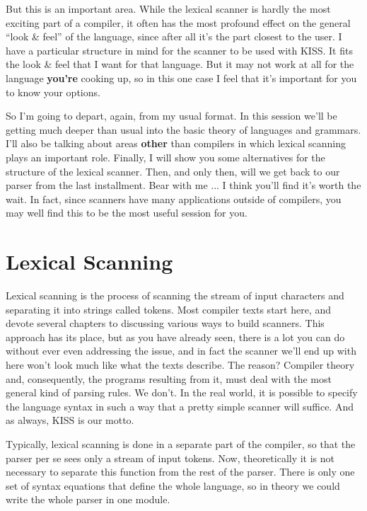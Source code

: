 But  this is an important area. While  the  lexical  scanner  is hardly the most  exciting  part  of  a compiler, it often has the most  profound  effect  on  the  general  ``look \& feel''  of  the language, since after all it's the  part  closest to the user. I have a particular structure in mind for the scanner  to  be  used with  KISS. It fits the look \&  feel  that  I  want  for  that language. But it may not work at  all  for  the  language {\bfseries you're} cooking  up, so  in this one case I feel that it's important for you to know your options.

So I'm going to depart, again, from my  usual  format. In this session we'll be getting  much  deeper  than usual into the basic theory of languages and  grammars. I'll  also be talking about areas {\bfseries other} than compilers in  which  lexical  scanning  plays an important role. Finally, I will show you  some  alternatives for the structure of the lexical scanner. Then, and only  then, will we get back to our parser  from  the last installment. Bear with me ... I think you'll find it's worth the wait. In fact, since scanners have many applications  outside  of  compilers, you may well find this to be the most useful session for you.

\section{Lexical Scanning}

Lexical scanning is the process of scanning the  stream  of input characters and separating it  into  strings  called tokens. Most compiler  texts  start  here, and  devote  several  chapters  to discussing various ways to build scanners. This approach has its place, but as you have already  seen, there  is a lot you can do without ever even addressing the issue, and in  fact  the scanner we'll  end  up with here won't look  much  like  what  the  texts describe. The reason?    Compiler  theory and, consequently, the programs resulting from it, must  deal with the most general kind of parsing rules. We don't. In the real  world, it is possible to specify the language syntax in such a way that a pretty simple scanner will suffice. And as always, KISS is our motto.

Typically, lexical scanning is  done  in  a  separate part of the compiler, so that the parser per  se  sees only a stream of input tokens. Now, theoretically it  is not necessary to separate this function from the rest of the parser. There is  only  one set of syntax equations that define the  whole language, so in theory we could write the whole parser in one module.


